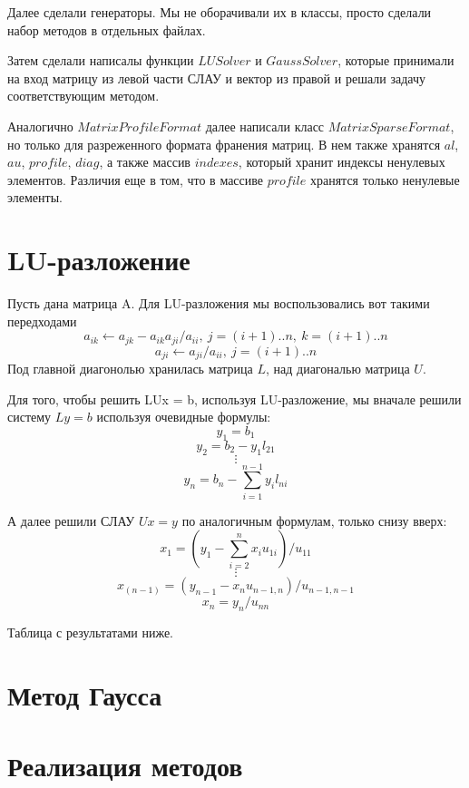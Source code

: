 Далее сделали генераторы. Мы не оборачивали их в классы, просто сделали набор методов в отдельных файлах.

Затем сделали написалы функции $LUSolver$ и $GaussSolver$, которые принимали на вход 
матрицу из левой части СЛАУ и вектор из правой и решали задачу соответствующим методом.

Аналогично $MatrixProfileFormat$ далее написали класс $MatrixSparseFormat$, но только для разреженного формата
франения матриц. В нем также хранятся $al$, $au$, $profile$, $diag$, а также массив $indexes$, 
который хранит индексы ненулевых элементов. Различия еще в том, что 
в массиве $profile$ хранятся только ненулевые элементы.

\newpage
\section{LU-разложение}

Пусть дана матрица A. Для LU-разложения мы воспользовались вот такими передходами
$$a_{ik} \leftarrow a_{jk} - a_{ik}a_{ji}/a_{ii}, \ j = (i + 1)..n, \ k = (i + 1)..n$$
$$a_{ji} \leftarrow a_{ji}/a_{ii}, \ j = (i + 1)..n$$
Под главной диагонолью хранилась матрица $L$, над диагональю матрица $U$.

Для того, чтобы решить LUx = b, используя LU-разложение, мы вначале решили систему $Ly = b$
используя очевидные формулы:
$$y_1 = b_1$$
$$y_2 = b_2 - y_1l_{21}$$
$$\vdots$$
$$y_n = b_n - \sum_{i = 1}^{n - 1}y_il_{ni}$$


А далее решили СЛАУ $Ux = y$ по аналогичным формулам, только снизу вверх:
$$x_1 = (y_1 - \sum_{i = 2}^{n}x_iu_{1i})/u_{11}$$
$$\vdots$$
$$x_(n - 1) = (y_{n - 1} - x_nu_{n - 1, n})/u_{n - 1, n - 1}$$
$$x_n = y_n/u_{nn}$$

Таблица с результатами ниже.



\newpage
\section{Метод Гаусса}


\newpage
\section{Реализация методов}
